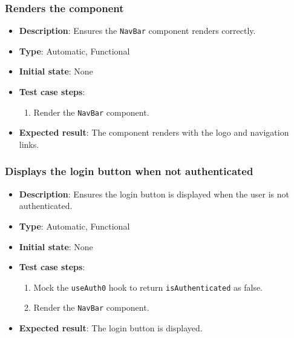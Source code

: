 \documentclass[12pt, titlepage]{article}
\begin{document}
\subsubsection{Renders the component}
\begin{itemize}
    \item \textbf{Description}: Ensures the \texttt{NavBar} component renders correctly.
    \item \textbf{Type}: Automatic, Functional
    \item \textbf{Initial state}: None
    \item \textbf{Test case steps}:
    \begin{enumerate}
        \item Render the \texttt{NavBar} component.
    \end{enumerate}
    \item \textbf{Expected result}: The component renders with the logo and navigation links.
    
\end{itemize}

\subsubsection{Displays the login button when not authenticated}
\begin{itemize}
    \item \textbf{Description}: Ensures the login button is displayed when the user is not authenticated.
    \item \textbf{Type}: Automatic, Functional
    \item \textbf{Initial state}: None
    \item \textbf{Test case steps}:
    \begin{enumerate}
        \item Mock the \texttt{useAuth0} hook to return \texttt{isAuthenticated} as false.
        \item Render the \texttt{NavBar} component.
    \end{enumerate}
    \item \textbf{Expected result}: The login button is displayed.
\end{itemize}
\end{document}
